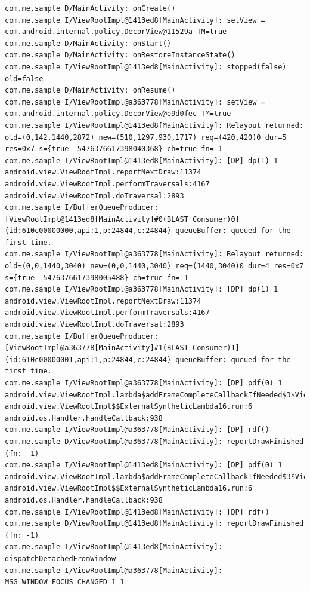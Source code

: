 \documentclass[9pt, b5paper]{article}
\begin{document}
\begin{verbatim}
com.me.sample D/MainActivity: onCreate() 
com.me.sample I/ViewRootImpl@1413ed8[MainActivity]: setView = com.android.internal.policy.DecorView@11529a TM=true
com.me.sample D/MainActivity: onStart() 
com.me.sample D/MainActivity: onRestoreInstanceState() 
com.me.sample I/ViewRootImpl@1413ed8[MainActivity]: stopped(false) old=false
com.me.sample D/MainActivity: onResume() 
com.me.sample I/ViewRootImpl@a363778[MainActivity]: setView = com.android.internal.policy.DecorView@e9d0fec TM=true
com.me.sample I/ViewRootImpl@1413ed8[MainActivity]: Relayout returned: old=(0,142,1440,2872) new=(510,1297,930,1717) req=(420,420)0 dur=5 res=0x7 s={true -5476376617398040368} ch=true fn=-1
com.me.sample I/ViewRootImpl@1413ed8[MainActivity]: [DP] dp(1) 1 android.view.ViewRootImpl.reportNextDraw:11374 android.view.ViewRootImpl.performTraversals:4167 android.view.ViewRootImpl.doTraversal:2893 
com.me.sample I/BufferQueueProducer: [ViewRootImpl@1413ed8[MainActivity]#0(BLAST Consumer)0](id:610c00000000,api:1,p:24844,c:24844) queueBuffer: queued for the first time.
com.me.sample I/ViewRootImpl@a363778[MainActivity]: Relayout returned: old=(0,0,1440,3040) new=(0,0,1440,3040) req=(1440,3040)0 dur=4 res=0x7 s={true -5476376617398005488} ch=true fn=-1
com.me.sample I/ViewRootImpl@a363778[MainActivity]: [DP] dp(1) 1 android.view.ViewRootImpl.reportNextDraw:11374 android.view.ViewRootImpl.performTraversals:4167 android.view.ViewRootImpl.doTraversal:2893 
com.me.sample I/BufferQueueProducer: [ViewRootImpl@a363778[MainActivity]#1(BLAST Consumer)1](id:610c00000001,api:1,p:24844,c:24844) queueBuffer: queued for the first time.
com.me.sample I/ViewRootImpl@a363778[MainActivity]: [DP] pdf(0) 1 android.view.ViewRootImpl.lambda$addFrameCompleteCallbackIfNeeded$3$ViewRootImpl:4969 android.view.ViewRootImpl$$ExternalSyntheticLambda16.run:6 android.os.Handler.handleCallback:938 
com.me.sample I/ViewRootImpl@a363778[MainActivity]: [DP] rdf()
com.me.sample D/ViewRootImpl@a363778[MainActivity]: reportDrawFinished (fn: -1) 
com.me.sample I/ViewRootImpl@1413ed8[MainActivity]: [DP] pdf(0) 1 android.view.ViewRootImpl.lambda$addFrameCompleteCallbackIfNeeded$3$ViewRootImpl:4969 android.view.ViewRootImpl$$ExternalSyntheticLambda16.run:6 android.os.Handler.handleCallback:938 
com.me.sample I/ViewRootImpl@1413ed8[MainActivity]: [DP] rdf()
com.me.sample D/ViewRootImpl@1413ed8[MainActivity]: reportDrawFinished (fn: -1) 
com.me.sample I/ViewRootImpl@1413ed8[MainActivity]: dispatchDetachedFromWindow
com.me.sample I/ViewRootImpl@a363778[MainActivity]: MSG_WINDOW_FOCUS_CHANGED 1 1
\end{verbatim}
\end{document}
